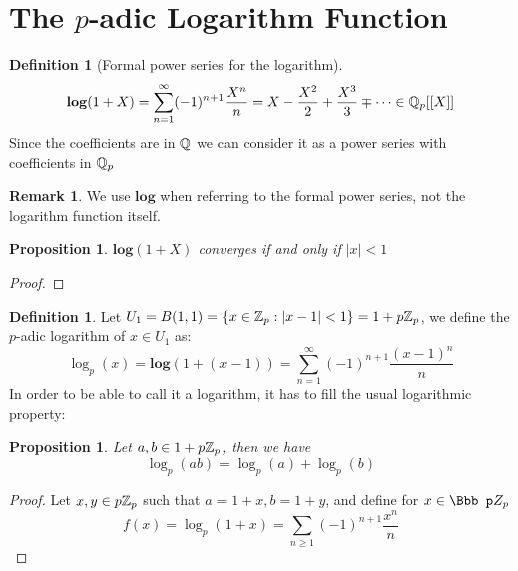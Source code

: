 \documentclass[a4paper]{article}
\theoremstyle{plain}
\newtheorem{prop}[thm]{Proposition}
\theoremstyle{definition}
\newtheorem{defi}[thm]{Definition}
\newtheorem{rem}[thm]{Remark}
\begin{document}
\section{The $p$-adic Logarithm Function}
\begin{defi}[Formal power series for the logarithm]   $$\mathbf{log}(1+X) = \sum_{n=1}^{\infty} (-1)^{n+1}\frac {X^{n}}{n} = X - \frac{X^{2}}{2} + \frac{X^{3}}{3} \mp \cdots \in \Bbb Q_{p}[[X]]$$
  Since the coefficients are in $\Bbb Q$ we can consider it as a power series with coefficients in $\Bbb Q_{p}$
\end{defi}
\begin{rem}
We use $\mathbf{log}$ when referring to the formal power series, not the logarithm function itself.
\end{rem}
\begin{prop} $\mathbf{log}(1+X)$ converges if and only if $|x| < 1$
\end{prop}
\begin{proof}
\end{proof}
\begin{defi}Let $U_{1} = B(1,1) = \{x \in \Bbb Z_{p} : |x-1| < 1\} = 1+p\Bbb Z_{p}$, we define the $p$-adic logarithm of $x \in U_{1}$ as:
  $$\log_{p}(x) = \mathbf{log}(1+(x-1)) = \sum_{n=1}^{\infty} (-1)^{n+1}\frac {(x-1)^{n}}{n}$$
  In order to be able to call it a logarithm, it has to fill the usual logarithmic property:
\end{defi}
\begin{prop}
  Let $a, b \in 1+p\Bbb Z_{p}$, then we have
  $$\log_{p}(ab) = \log_{p}(a) + \log_{p}(b)$$
\end{prop}
\begin{proof}
  Let $x, y \in p\Bbb Z_{p}$ such that $a= 1+x, b =1+y$, and define for $x \in \Bbb pZ_{p}$
  $$f(x) = \log_{p}(1+x) = \sum_{n \geq 1}(-1)^{n+1}\frac {x^{n}}{n}$$
\end{proof}
\end{document}
